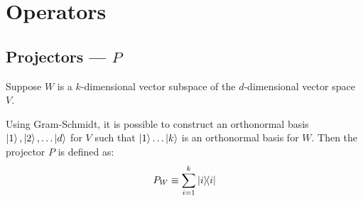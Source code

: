 \section{Operators}

\subsection{Projectors --- $P$}

Suppose $W$ is a $k$-dimensional vector subspace of the $d$-dimensional 
vector space $V$. 

Using Gram-Schmidt, it is possible to construct an orthonormal basis
$\ket{1}, \ket{2}, \dots \ket{d}$ for $V$ such that $\ket{1} \dots \ket{k}$
is an orthonormal basis for $W$. Then the projector $P$ is defined as:
\begin{align*}
    P_W \equiv \sum_{i=1}^k \ketbra{i}
\end{align*}

